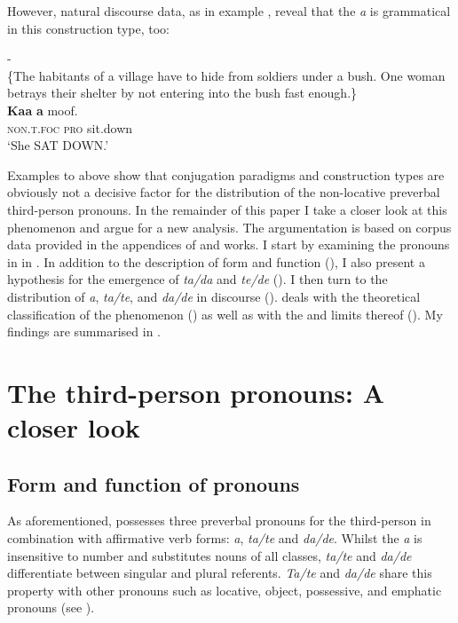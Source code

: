 \documentclass[output=paper
,newtxmath
,modfonts
,nonflat]{langsci/langscibook}
\begin{document}
However, natural discourse data, as in example , reveal that the  \textit{a} is grammatical in this construction type, too:


\ea\label{ex:apel:8}
{- \citep[276]{Faye1979}}\\
{\-\hspace{0cm}\{The habitants of a village have to hide from soldiers under a bush. One woman betrays their shelter by not entering into the bush fast enough.\}}\\
\gll   \textbf{Kaa} \textbf{a} moof.\\
     \textsc{non.t.foc} \textsc{pro} sit.down \\
\glt ‘She SAT DOWN.’
\z

Examples  to  above show that conjugation paradigms and construction types are obviously not a decisive factor for the distribution of the non-locative preverbal third-person  pronouns. In the remainder of this paper I take a closer look at this phenomenon and argue for a new analysis. The argumentation is based on corpus data provided in the appendices of  and  works. I start by examining the  pronouns in  in . In addition to the description of form and function (), I also present a hypothesis for the emergence of \textit{ta/da} and \textit{te/de} (). I then turn to the distribution of \textit{a}, \textit{ta/te}, and \textit{da/de} in discourse ().  deals with the theoretical classification of the phenomenon () as well as with the  and limits thereof (). My findings are summarised in .

\section{The third-person pronouns: A closer look}\label{sec:apel:2}

\subsection{Form and function of pronouns}\label{sec:apel:2.1}

As aforementioned,  possesses three preverbal  pronouns for the third-person in combination with affirmative verb forms: \textit{a}, \textit{ta/te} and \textit{da/de}. Whilst the  \textit{a} is insensitive to number and substitutes nouns of all classes, \textit{ta/te} and \textit{da/de} differentiate between singular and plural referents. \textit{Ta/te} and \textit{da/de} share this property with other  pronouns such as locative, object, possessive, and emphatic pronouns (see ).
\end{document}
